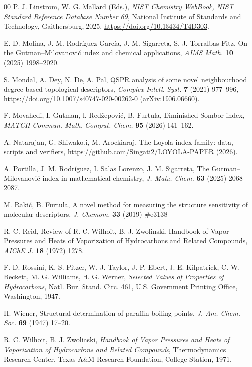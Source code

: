 \documentclass[a5paper, 10pt]{article}
\theoremstyle{plain}
\theoremstyle{remark}
\theoremstyle{definition}
\begin{document}
\begin{thebibliography}{00}
   P. J. Linstrom, W. G. Mallard (Eds.), \textit{NIST
  Chemistry WebBook, NIST Standard Reference Database Number 69\/}, National
  Institute of Standards and Technology, Gaithersburg, 2025,
  \url{https://doi.org/10.18434/T4D303}.

   E. D. Molina, J. M.
  Rodr\'iguez-Garc\'ia, J. M. Sigarreta, S. J. Torralbas Fitz, On the
  Gutman--Milovanovi\'c index and chemical applications, \textit{AIMS
  Math.\/} \textbf{10} (2025) 1998--2020.

  S. Mondal, A. Dey, N. De, A. Pal, QSPR analysis of some novel
  neighbourhood degree-based topological descriptors, \textit{Complex
  Intell. Syst.\/} \textbf{7} (2021) 977--996,
  \url{https://doi.org/10.1007/s40747-020-00262-0} (arXiv:1906.06660).

   F. Movahedi, I. Gutman, I.
  Red\v{z}epovi\'c, B. Furtula, Diminished Sombor index, \textit{MATCH Commun.
  Math. Comput. Chem.\/} \textbf{95} (2026) 141--162.

   A. Natarajan, G. Shiwakoti, M. Arockiaraj,
  The Loyola index family: data, scripts and verifiers,
  \url{https://github.com/Singati2/LOYOLA-PAPER} (2026).

   A. Portilla, J. M. Rodr\'iguez,
  I. Salas Lorenzo, J. M. Sigarreta, The Gutman--Milovanovi\'c index
  in mathematical chemistry, \textit{J. Math. Chem.\/} \textbf{63}
  (2025) 2068--2087.

   M. Raki\'c, B. Furtula, A novel method for
  measuring the structure sensitivity of molecular descriptors, \textit{J. Chemom.\/} \textbf{33} (2019) \#e3138.

   R. C. Reid, Review of R. C. Wilhoit, B. J. Zwolinski, Handbook
  of Vapor Pressures and Heats of Vaporization of Hydrocarbons and Related
  Compounds, \textit{AIChE J.\/} \textbf{18} (1972) 1278.

   F. D. Rossini, K. S. Pitzer, W. J. Taylor,
  J. P. Ebert, J. E. Kilpatrick, C. W. Beckett, M. G. Williams, H. G. Werner,
  \textit{Selected Values of Properties of Hydrocarbons\/}, Natl. Bur.
  Stand. Circ. 461, U.S. Government Printing Office, Washington, 1947.

   H. Wiener, Structural determination of paraffin boiling
  points, \textit{J. Am. Chem. Soc.\/} \textbf{69} (1947) 17--20.

   R. C. Wilhoit, B. J. Zwolinski,
  \textit{Handbook of Vapor Pressures and Heats of Vaporization of
  Hydrocarbons and Related Compounds\/}, Thermodynamics Research Center, Texas A\&M Research Foundation,
  College Station, 1971.

\end{thebibliography}
\end{document}
